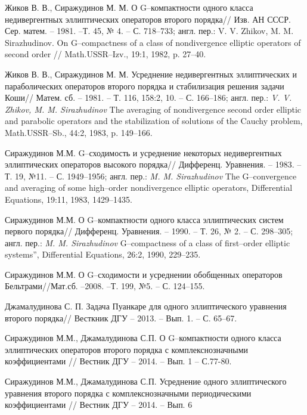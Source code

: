 \begin{thebibliography}{1}
{Жиков В. В., Сиражудинов М. М.}
О G--компактности одного класса недивергентных эллиптических операторов второго порядка// Изв. АН СССР. Сер. матем. -- 1981. --Т. 45, № 4. -- С. 718--733; англ. пер.: V. V. Zhikov, M. M. Sirazhudinov. On G--compactness of a class of nondivergence elliptic operators of second order // Math.USSR--Izv., 19:1, 1982, p. 27--40.

{Жиков В. В., Сиражудинов М. М.} Усреднение недивергентных эллиптических и параболических операторов второго порядка и      стабилизация решения задачи Коши// Матем. сб. -- 1981. -- Т. 116, 158:2, 10. -- С. 166--186; англ. пер.: \textit{V. V. Zhikov, M. M. Sirazhudinov}  The averaging of nondivergence second order elliptic and parabolic operators and the stabilization of solutions of the Cauchy problem, Math.USSR--Sb., 44:2, 1983, p. 149--166.

{Сиражудинов М.М.}
G--сходимость и усреднение некоторых недивергентных эллиптических операторов высокого порядка//
Дифференц. Уравнения. -- 1983. -- Т. 19, №11. -- С. 1949--1956; англ. пер.: \textit{M. M. Sirazhudinov} The G--convergence and averaging of some high--order  nondivergence elliptic operators, Differential Equations, 19:11, 1983, 1429--1435.

{Сиражудинов М.М. }
О G--компактности одного класса эллиптических систем первого порядка// Дифференц. Уравнения. --  1990. -- Т. 26, № 2. -- С. 298--305; англ. пер.: \textit{M. M. Sirazhudinov} G--compactness of a class of first--order elliptic systems'', Differential Equations, 26:2, 1990, 229--235.

{Сиражудинов М.М.}
О G--сходимости и усреднении обобщенных операторов Бельтрами//Мат.сб. --2008. --Т. 199, №5. -- С. 124--155.

{Джамалудинова  С. П.}
Задача Пуанкаре для одного эллиптического уравнения второго порядка// Весткник ДГУ -- 2013. -- Вып. 1. -- С. 65--67.

{Сиражудинов М.М., Джамалудинова С.П.}
О G–компактности одного класса эллиптических операторов второго порядка с комплекснозначными коэффициентами // Вестник ДГУ -- 2014. -- Вып. 1 -- С.77-80.

{Сиражудинов М.М., Джамалудинова С.П.}
Усреднение одного эллиптического уравнения второго порядка с комплекснозначными периодическими коэффициентами // Вестник ДГУ -- 2014. -- Вып. 6 %


\end{thebibliography}
